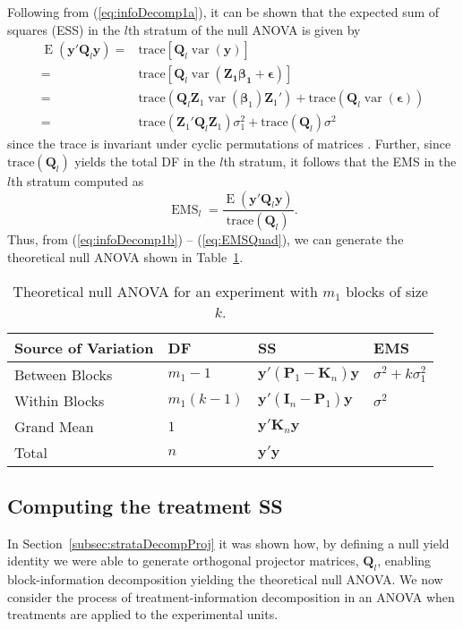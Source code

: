 \documentclass[article]{jss}
\newcommand{\mP}{\mathbf{P}}
\newcommand{\I}{\mathbf{I}}
\newcommand{\K}{\mathbf{K}}
\newcommand{\Z}{\mathbf{Z}}
\newcommand{\Q}{\mathbf{Q}}
\begin{document}
Following from (\ref{eq:infoDecomp1a}), it can be shown that the expected sum of squares (ESS) in the $l$th stratum of the null ANOVA is given by
\begin{align}
\nonumber \operatorname{E}(\bm{y}'\Q_l\bm{y})= & \mathrm{trace}\left[\Q_l\operatorname{var}(\bm{y})\right] \\ 
\nonumber = & \mathrm{trace}\left[\Q_l\operatorname{var}(\bm{ \Z_1\bm{\beta}_1 + \bm{\epsilon}})\right] \\
\nonumber = & \mathrm{trace}(\Q_l\Z_1 \operatorname{var}(\bm{\beta}_1)\Z_1')  + \mathrm{trace}(\Q_l \operatorname{var}(\bm{\epsilon}))  \\
 = & \mathrm{trace}(\Z_1'\Q_l\Z_1) \sigma^2_1  + \mathrm{trace}(\Q_l) \sigma^2  \label{eq:ESSQuad}
\end{align}
since the trace is invariant under cyclic permutations of matrices \citep{Searle1982}. Further, since $ \mathrm{trace}(\Q_l)$ yields the total DF in the $l$th stratum, it follows that the EMS in the $l$th stratum computed as 
\begin{equation}\label{eq:EMSQuad}
\operatorname{EMS}_l=\frac{\operatorname{E}(\bm{y}'\Q_l\bm{y})}{ \mathrm{trace}(\Q_l)}.
\end{equation}
Thus, from (\ref{eq:infoDecomp1b}) -- (\ref{eq:EMSQuad}), we can generate  the theoretical null ANOVA shown in Table~\ref{tab:infoDecomp}. 

\begin{table}[ht]
\centering
\caption{Theoretical null ANOVA	for an experiment with $m_1$ blocks of size $k$.}
\begin{tabular}[t]{llll}
\toprule
 \multicolumn{1}{l}{\bf Source of Variation}&  \multicolumn{1}{l}{\bf DF} & \multicolumn{1}{l}{\bf SS} & \multicolumn{1}{l}{\bf EMS}\\
\midrule
Between Blocks 	 &$m_1-1$ & $\bm{y}'(\mP_{1}-\K_n)\bm{y}$	& $\sigma^2 + k\sigma_{1}^2$\\
Within Blocks 	&$m_1(k - 1)$ & $\bm{y}'(\I_n - \mP_{1})\bm{y}$  & $\sigma^2$\\
\hline
Grand Mean	& $1$ & $\bm{y}'\K_n\bm{y}$ \\
\midrule
Total 	& $n$ & $\bm{y}'\bm{y}$ \\
\bottomrule
\end{tabular}
\label{tab:infoDecomp}
\end{table}

\subsection{Computing the treatment SS}
\label{subsec:estTrt}
In Section~\ref{subsec:strataDecompProj} it was shown how, by defining a null yield identity we were able to generate orthogonal projector matrices, $\Q_{l}$, enabling block-information decomposition yielding the theoretical null ANOVA. We now consider the process of treatment-information decomposition in an ANOVA when treatments are applied to the experimental units. 
\end{document}
